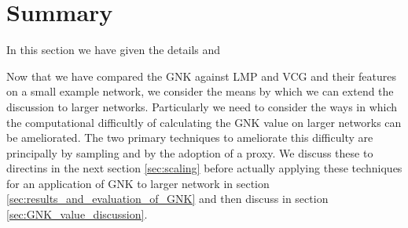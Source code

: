 \section{Summary}

In this section we have given the details and %

Now that we have compared the GNK against LMP and VCG and their features on a small example network, we consider the means by which we can extend the discussion to larger networks.
Particularly we need to consider the ways in which the computational difficultly of calculating the GNK value on larger networks can be ameliorated.
The two primary techniques to ameliorate this difficulty are principally by sampling and by the adoption of a proxy. We discuss these to directins in the next section \ref{sec:scaling} before actually applying these techniques for an application of GNK to larger network in section \ref{sec:results_and_evaluation_of_GNK} and then discuss in section \ref{sec:GNK_value_discussion}.











